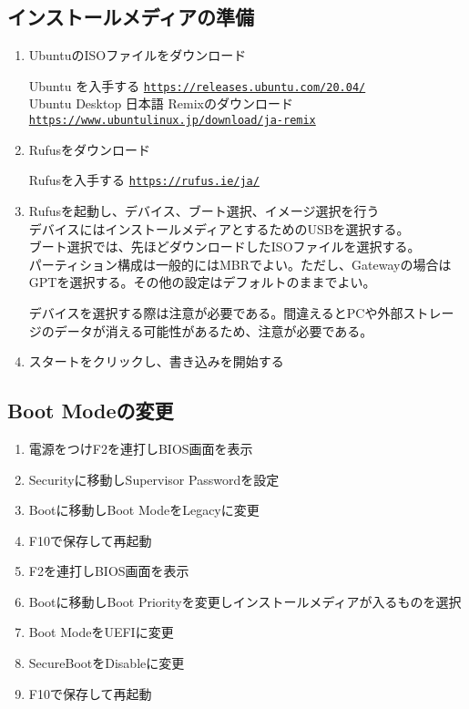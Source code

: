 \documentclass[a4paper, 11pt, dvipdfmx]{jsarticle}
\begin{document}
\subsection{インストールメディアの準備}
  \begin{enumerate}
    \item UbuntuのISOファイルをダウンロード
    \begin{tcolorbox}[blue]
      Ubuntu を入手する \href{https://releases.ubuntu.com/20.04/}{\texttt{https://releases.ubuntu.com/20.04/}}\\
      Ubuntu Desktop 日本語 Remixのダウンロード \href{https://www.ubuntulinux.jp/download/ja-remix}{\texttt{https://www.ubuntulinux.jp/download/ja-remix}}
    \end{tcolorbox}
    \item Rufusをダウンロード
    \begin{tcolorbox}[blue]
      Rufusを入手する \href{https://rufus.ie/ja/}{\texttt{https://rufus.ie/ja/}}
    \end{tcolorbox}
    \item Rufusを起動し、デバイス、ブート選択、イメージ選択を行う\\
    デバイスにはインストールメディアとするためのUSBを選択する。\\
    ブート選択では、先ほどダウンロードしたISOファイルを選択する。\\
    パーティション構成は一般的にはMBRでよい。ただし、Gatewayの場合はGPTを選択する。その他の設定はデフォルトのままでよい。
      \begin{tcolorbox}[yellow]
        デバイスを選択する際は注意が必要である。間違えるとPCや外部ストレージのデータが消える可能性があるため、注意が必要である。
      \end{tcolorbox}
    \item スタートをクリックし、書き込みを開始する
  \end{enumerate}

\subsection{Boot Modeの変更}
  \begin{enumerate}
    \item 電源をつけF2を連打しBIOS画面を表示
    \item Securityに移動しSupervisor Passwordを設定
    \item Bootに移動しBoot ModeをLegacyに変更
    \item F10で保存して再起動
    \item F2を連打しBIOS画面を表示
    \item Bootに移動しBoot Priorityを変更しインストールメディアが入るものを選択
    \item Boot ModeをUEFIに変更
    \item SecureBootをDisableに変更
    \item F10で保存して再起動
  \end{enumerate}
\end{document}
